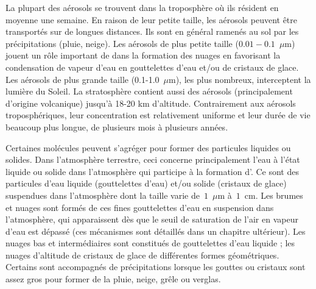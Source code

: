 La plupart des aérosols se trouvent dans la troposphère où ils résident en moyenne une semaine. En raison de leur petite taille, les aérosols peuvent être transportés sur de longues distances. Ils sont en général ramenés au sol par les précipitations (pluie, neige). Les aérosols de plus petite taille ($0.01-0.1$~$\mu$m) jouent un rôle important de  dans la formation des nuages en favorisant la condensation de vapeur d'eau en gouttelettes d'eau et/ou de cristaux de glace. Les aérosols de plus grande taille (0.1-1.0~$\mu$m), les plus nombreux, interceptent la lumière du Soleil. La stratosphère contient aussi des aérosols (principalement d'origine volcanique) jusqu'à 18-20 km d’altitude. Contrairement aux aérosols troposphériques, leur concentration est relativement uniforme et leur durée de vie beaucoup plus longue, de plusieurs mois à plusieurs années.  

\sk
Certaines molécules peuvent s’agréger pour former des particules liquides ou solides. Dans l'atmosphère terrestre, ceci concerne principalement l'eau à l'état liquide ou solide dans l'atmosphère qui participe à la formation d'. Ce sont des particules d’eau liquide (gouttelettes d'eau) et/ou solide (cristaux de glace) suspendues dans l'atmosphère dont la taille varie de~$1$~$\mu$m à~$1$~cm. Les brumes et nuages sont formés de ces fines gouttelettes d'eau en suspension dans l'atmosphère, qui apparaissent dès que le seuil de saturation de l'air en vapeur d'eau est dépassé (ces mécanismes sont détaillés dans un chapitre ultérieur). Les nuages bas et intermédiaires sont constitués de gouttelettes d’eau liquide ; les nuages d’altitude de cristaux de glace de différentes formes géométriques. Certains sont accompagnés de précipitations lorsque les gouttes ou cristaux sont assez gros pour former de la pluie, neige, grêle ou verglas. %

